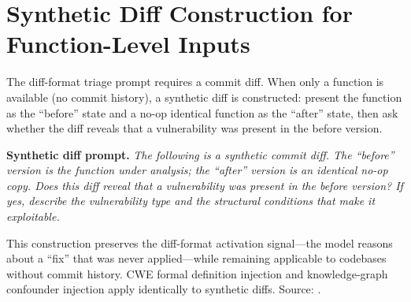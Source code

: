 \documentclass[11pt]{article}
\begin{document}
\section{Synthetic Diff Construction for Function-Level Inputs}
\label{app:synth-diff}

The diff-format triage prompt requires a commit diff. When only a
function is available (no commit history), a synthetic diff is
constructed: present the function as the ``before'' state and a no-op
identical function as the ``after'' state, then ask whether the diff
reveals that a vulnerability was present in the before version.

\noindent\textbf{Synthetic diff prompt.} \textit{The following is a
synthetic commit diff. The ``before'' version is the function under
analysis; the ``after'' version is an identical no-op copy. Does this
diff reveal that a vulnerability was present in the before version? If
yes, describe the vulnerability type and the structural conditions that
make it exploitable.}

This construction preserves the diff-format activation signal---the
model reasons about a ``fix'' that was never applied---while remaining
applicable to codebases without commit history. CWE formal definition
injection and knowledge-graph confounder injection apply identically to
synthetic diffs. Source: \citep{tower2026vuln}.
\end{document}
